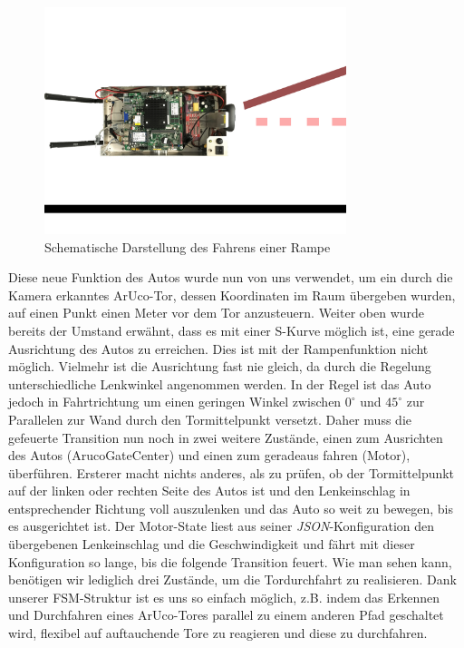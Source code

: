 \begin{figure}[htbp] 
	\centering
	\includegraphics[width=250pt]{images/scharfeRampe.png}
	\caption{Schematische Darstellung des Fahrens einer Rampe}
	\label{fig:ScharfeRampe}
\end{figure}

Diese neue Funktion des Autos wurde nun von uns verwendet, um ein durch die Kamera erkanntes ArUco-Tor, dessen Koordinaten im Raum übergeben wurden, auf einen Punkt einen Meter vor dem Tor anzusteuern.
Weiter oben wurde bereits der Umstand erwähnt, dass es mit einer S-Kurve möglich ist, eine gerade Ausrichtung des Autos zu erreichen. Dies ist mit der Rampenfunktion nicht möglich. Vielmehr ist die Ausrichtung fast nie gleich, da durch die Regelung unterschiedliche Lenkwinkel angenommen werden. In der Regel ist das Auto jedoch in Fahrtrichtung um einen geringen Winkel zwischen $0^\circ$ und $45^\circ$ zur Parallelen zur Wand durch den Tormittelpunkt versetzt. Daher muss die gefeuerte Transition nun noch in zwei weitere Zustände, einen zum Ausrichten des Autos (ArucoGateCenter) und einen zum geradeaus fahren (Motor), überführen. Ersterer macht nichts anderes, als zu prüfen, ob der Tormittelpunkt auf der linken oder rechten Seite des Autos ist und den Lenkeinschlag in entsprechender Richtung voll auszulenken und das Auto so weit zu bewegen, bis es ausgerichtet ist. Der Motor-State liest aus seiner \textit{JSON}-Konfiguration den übergebenen Lenkeinschlag und die Geschwindigkeit und fährt mit dieser Konfiguration so lange, bis die folgende Transition feuert. 
\newline
\newline
Wie man sehen kann, benötigen wir lediglich drei Zustände, um die Tordurchfahrt zu realisieren. Dank unserer FSM-Struktur ist es uns so einfach möglich, z.B. indem das Erkennen und Durchfahren eines ArUco-Tores parallel zu einem anderen Pfad geschaltet wird, flexibel auf auftauchende Tore zu reagieren und diese zu durchfahren. 
  